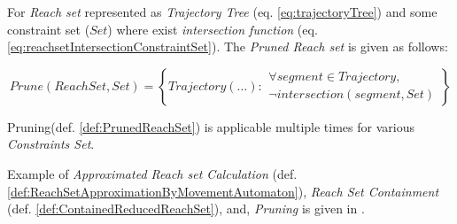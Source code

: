     \begin{definition}\label{def:PrunedReachSet} 
        For \emph{Reach set} represented as \emph{Trajectory Tree} (eq. \ref{eq:trajectoryTree}) and some constraint set ($Set$) where exist \emph{intersection function} (eq. \ref{eq:reachsetIntersectionConstraintSet}). The \emph{Pruned Reach set} is given as follows:
        
        \begin{equation}\label{eq:PrunedReachSet}
            Prune(ReachSet,Set) = 
            \left\{
                Trajectory(\dots):
                \begin{gathered} 
                \forall segment \in Trajectory,\\ \neg intersection(segment, Set) 
                \end{gathered}
            \right\}
        \end{equation}
    \end{definition}
    
    
    \begin{note} 
        Pruning(def. \ref{def:PrunedReachSet}) \cite{birmingham1988tree} is applicable multiple times for various \emph{Constraints Set}. 
    
        Example of \emph{Approximated Reach set Calculation} (def. \ref{def:ReachSetApproximationByMovementAutomaton}), \emph{Reach Set Containment} (def. \ref{def:ContainedReducedReachSet}), and, \emph{Pruning} is given in \cite{gomola2017obstacle}.
    \end{note}
